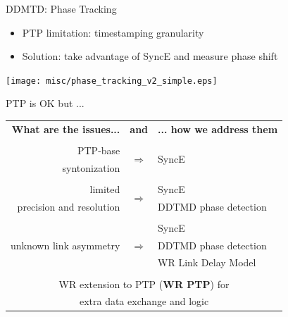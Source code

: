 \documentclass[compress,red]{beamer}
\begin{document}
\begin{frame}{DDMTD: Phase Tracking}
	\begin{center}
    \begin{itemize}
      \item PTP limitation: timestamping granularity
      \item Solution: take advantage of SyncE and measure phase shift
    \end{itemize}
		\texttt{[image: misc/phase\_tracking\_v2\_simple.eps]}
	\end{center}

\end{frame}
\begin{frame}{PTP is OK but ...}

  \resizebox{11cm}{!} 
  {
    \begin{tabular}{ r c l }
  {\bf What are the issues...} 	& {\bf and}      & {\bf ... how we address them}  \\
				&     		 &        \\
      PTP-base		 	& \multirow{2}{*}{$\Rightarrow$}  & \multirow{2}{*}{SyncE }\\
      syntonization	        &      		 &        \\
				&      		 &        			\\
      limited             	&\multirow{2}{*}{$\Rightarrow$}  	 & SyncE \\
      precision and resolution  &      		 & DDTMD phase detection\\
				&    		 &        \\
			        &      		 & SyncE  \\
      unknown link asymmetry    & $\Rightarrow$  & DDTMD phase detection \\
				&      		 & WR Link Delay Model \\
				&      		 &        \\
      \multicolumn{3}{c}{WR extension to PTP ({\bf WR PTP}) for } \\
      \multicolumn{3}{c}{extra data exchange and logic} \\
    \end{tabular}
  }
\end{frame}
\end{document}

